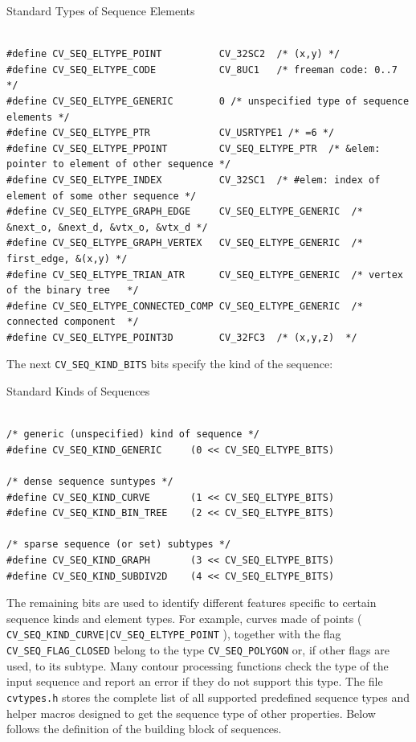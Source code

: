 Standard Types of Sequence Elements

\begin{lstlisting}

#define CV_SEQ_ELTYPE_POINT          CV_32SC2  /* (x,y) */
#define CV_SEQ_ELTYPE_CODE           CV_8UC1   /* freeman code: 0..7 */
#define CV_SEQ_ELTYPE_GENERIC        0 /* unspecified type of sequence elements */
#define CV_SEQ_ELTYPE_PTR            CV_USRTYPE1 /* =6 */
#define CV_SEQ_ELTYPE_PPOINT         CV_SEQ_ELTYPE_PTR  /* &elem: pointer to element of other sequence */
#define CV_SEQ_ELTYPE_INDEX          CV_32SC1  /* #elem: index of element of some other sequence */
#define CV_SEQ_ELTYPE_GRAPH_EDGE     CV_SEQ_ELTYPE_GENERIC  /* &next_o, &next_d, &vtx_o, &vtx_d */
#define CV_SEQ_ELTYPE_GRAPH_VERTEX   CV_SEQ_ELTYPE_GENERIC  /* first_edge, &(x,y) */
#define CV_SEQ_ELTYPE_TRIAN_ATR      CV_SEQ_ELTYPE_GENERIC  /* vertex of the binary tree   */
#define CV_SEQ_ELTYPE_CONNECTED_COMP CV_SEQ_ELTYPE_GENERIC  /* connected component  */
#define CV_SEQ_ELTYPE_POINT3D        CV_32FC3  /* (x,y,z)  */

\end{lstlisting}

The next \texttt{CV\_SEQ\_KIND\_BITS} bits specify the kind of the sequence:

Standard Kinds of Sequences

\begin{lstlisting}

/* generic (unspecified) kind of sequence */
#define CV_SEQ_KIND_GENERIC     (0 << CV_SEQ_ELTYPE_BITS)

/* dense sequence suntypes */
#define CV_SEQ_KIND_CURVE       (1 << CV_SEQ_ELTYPE_BITS)
#define CV_SEQ_KIND_BIN_TREE    (2 << CV_SEQ_ELTYPE_BITS)

/* sparse sequence (or set) subtypes */
#define CV_SEQ_KIND_GRAPH       (3 << CV_SEQ_ELTYPE_BITS)
#define CV_SEQ_KIND_SUBDIV2D    (4 << CV_SEQ_ELTYPE_BITS)

\end{lstlisting}

The remaining bits are used to identify different features specific
to certain sequence kinds and element types. For example, curves
made of points ( \texttt{CV\_SEQ\_KIND\_CURVE|CV\_SEQ\_ELTYPE\_POINT} ),
together with the flag \texttt{CV\_SEQ\_FLAG\_CLOSED} belong to the
type \texttt{CV\_SEQ\_POLYGON} or, if other flags are used, to its
subtype. Many contour processing functions check the type of the input
sequence and report an error if they do not support this type. The
file \texttt{cvtypes.h} stores the complete list of all supported
predefined sequence types and helper macros designed to get the sequence
type of other properties. Below follows the definition of the building
block of sequences.

